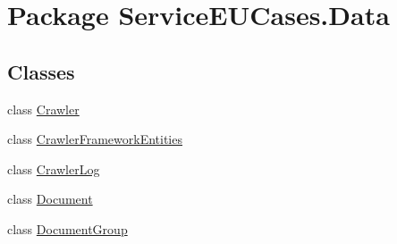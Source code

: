 \hypertarget{namespace_service_e_u_cases_1_1_data}{\section{Package Service\-E\-U\-Cases.\-Data}
\label{namespace_service_e_u_cases_1_1_data}
}
\subsection*{Classes}
\begin{DoxyCompactItemize}
\item 
class \hyperlink{class_service_e_u_cases_1_1_data_1_1_crawler}{Crawler}
\item 
class \hyperlink{class_service_e_u_cases_1_1_data_1_1_crawler_framework_entities}{Crawler\-Framework\-Entities}
\item 
class \hyperlink{class_service_e_u_cases_1_1_data_1_1_crawler_log}{Crawler\-Log}
\item 
class \hyperlink{class_service_e_u_cases_1_1_data_1_1_document}{Document}
\item 
class \hyperlink{class_service_e_u_cases_1_1_data_1_1_document_group}{Document\-Group}
\end{DoxyCompactItemize}
